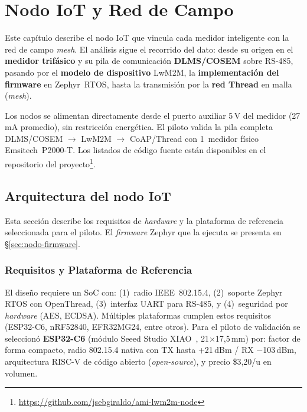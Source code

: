 \chapter[Nodo IoT y Red de Campo]{Nodo IoT y Red de Campo}
\label{chap:nodo-iot}

Este capítulo describe el nodo IoT que vincula cada medidor inteligente con la red de campo \emph{mesh}. El análisis sigue el recorrido del dato: desde su origen en el \textbf{medidor trifásico} y su pila de comunicación \textbf{DLMS/COSEM} sobre RS-485, pasando por el \textbf{modelo de dispositivo} LwM2M, la \textbf{implementación del firmware} en Zephyr~RTOS, hasta la transmisión por la \textbf{red Thread} en malla (\emph{mesh}).

Los nodos se alimentan directamente desde el puerto auxiliar 5\,V del medidor (27\,mA promedio), sin restricción energética. El piloto valida la pila completa DLMS/COSEM $\rightarrow$ LwM2M $\rightarrow$ CoAP/Thread con 1~medidor físico Emsitech~P2000-T. Los listados de código fuente están disponibles en el repositorio del proyecto\footnote{\url{https://github.com/jsebgiraldo/ami-lwm2m-node}}.


\section{Arquitectura del nodo IoT}
\label{sec:nodo-hardware}

Esta sección describe los requisitos de \emph{hardware} y la plataforma de referencia seleccionada para el piloto. El \emph{firmware} Zephyr que la ejecuta se presenta en §\ref{sec:nodo-firmware}.

\subsection{Requisitos y Plataforma de Referencia}
\label{sec:nodo-hardware-arquitectura}

El diseño requiere un SoC con: (1)~radio IEEE~802.15.4, (2)~soporte Zephyr RTOS con OpenThread, (3)~interfaz UART para RS-485, y (4)~seguridad por \emph{hardware} (AES, ECDSA). Múltiples plataformas cumplen estos requisitos (ESP32-C6, nRF52840, EFR32MG24, entre otros). Para el piloto de validación se seleccionó \textbf{ESP32-C6} (módulo Seeed Studio XIAO~\cite{seeedstudioXIAOESP32C62024}, 21$\times$17,5\,mm) por: factor de forma compacto, radio 802.15.4 nativa con TX hasta +21\,dBm / RX $-$103\,dBm, arquitectura RISC-V de código abierto (\emph{open-source}), y precio \$3,20/u en volumen.

